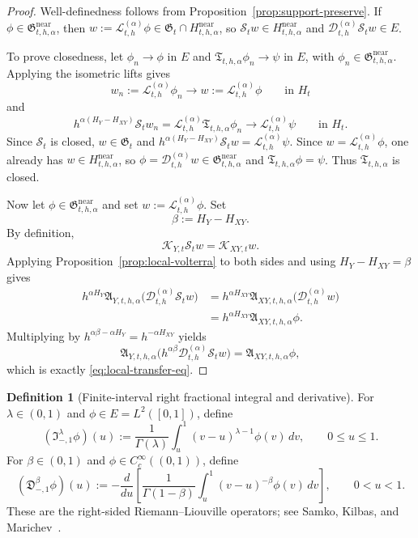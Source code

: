 \documentclass[11pt,a4paper]{amsart}
\theoremstyle{plain}
\theoremstyle{definition}
\newtheorem{definition}[theorem]{Definition}
\theoremstyle{remark}
\begin{document}
\begin{proof}
Well-definedness follows from Proposition~\ref{prop:support-preserve}.  If
$\phi\in\mathfrak G_{t,h,\alpha}^{\mathrm{near}}$, then
$w:=\mathcal L_{t,h}^{(\alpha)}\phi\in \mathfrak G_t\cap H_{t,h,\alpha}^{\mathrm{near}}$, so
$\mathcal S_t w\in H_{t,h,\alpha}^{\mathrm{near}}$ and
$\mathcal D_{t,h}^{(\alpha)}\mathcal S_t w\in E$.

To prove closedness, let $\phi_n\to\phi$ in $E$ and
$\mathfrak T_{t,h,\alpha}\phi_n\to\psi$ in $E$, with
$\phi_n\in\mathfrak G_{t,h,\alpha}^{\mathrm{near}}$. Applying the isometric lifts gives
\[
w_n:=\mathcal L_{t,h}^{(\alpha)}\phi_n\to w:=\mathcal L_{t,h}^{(\alpha)}\phi
\qquad\text{in }H_t
\]
and
\[
h^{\alpha(H_Y-H_{XY})}\mathcal S_t w_n
=
\mathcal L_{t,h}^{(\alpha)}\mathfrak T_{t,h,\alpha}\phi_n
\longrightarrow
\mathcal L_{t,h}^{(\alpha)}\psi
\qquad\text{in }H_t.
\]
Since $\mathcal S_t$ is closed, $w\in\mathfrak G_t$ and
$h^{\alpha(H_Y-H_{XY})}\mathcal S_t w=\mathcal L_{t,h}^{(\alpha)}\psi$. Since
$w=\mathcal L_{t,h}^{(\alpha)}\phi$, one already has $w\in H_{t,h,\alpha}^{\mathrm{near}}$,
so $\phi=\mathcal D_{t,h}^{(\alpha)}w\in\mathfrak G_{t,h,\alpha}^{\mathrm{near}}$ and
$\mathfrak T_{t,h,\alpha}\phi=\psi$. Thus $\mathfrak T_{t,h,\alpha}$ is closed.

Now let $\phi\in\mathfrak G_{t,h,\alpha}^{\mathrm{near}}$ and set
$w:=\mathcal L_{t,h}^{(\alpha)}\phi$. Set
\[
\beta:=H_Y-H_{XY}.
\]
By definition,
\[
\mathcal K_{Y,t}\mathcal S_t w=\mathcal K_{XY,t}w.
\]
Applying Proposition~\ref{prop:local-volterra} to both sides and using
$H_Y-H_{XY}=\beta$ gives
\begin{align*}
h^{\alpha H_Y}
\mathfrak A_{Y,t,h,\alpha}
\bigl(\mathcal D_{t,h}^{(\alpha)}\mathcal S_t w\bigr)
&=
h^{\alpha H_{XY}}
\mathfrak A_{XY,t,h,\alpha}
\bigl(\mathcal D_{t,h}^{(\alpha)}w\bigr) \\
&=
h^{\alpha H_{XY}}
\mathfrak A_{XY,t,h,\alpha}\phi.
\end{align*}
Multiplying by $h^{\alpha\beta-\alpha H_Y}=h^{-\alpha H_{XY}}$ yields
\[
\mathfrak A_{Y,t,h,\alpha}
\bigl(
h^{\alpha\beta}\mathcal D_{t,h}^{(\alpha)}\mathcal S_t w
\bigr)
=
\mathfrak A_{XY,t,h,\alpha}\phi,
\]
which is exactly \eqref{eq:local-transfer-eq}.
\end{proof}

\begin{definition}[Finite-interval right fractional integral and derivative]
\label{def:unit-fractional}
For $\lambda\in(0,1)$ and $\phi\in E=L^2([0,1])$, define
\begin{equation}\label{eq:Iminus1}
(\mathfrak I_{-,1}^\lambda \phi)(u)
:=
\frac{1}{\Gamma(\lambda)}
\int_u^1 (v-u)^{\lambda-1}\phi(v)\,dv,
\qquad 0\le u\le 1.
\end{equation}
For $\beta\in(0,1)$ and $\phi\in C_c^\infty((0,1))$, define
\begin{equation}\label{eq:Dminus1}
(\mathfrak D_{-,1}^\beta \phi)(u)
:=
-\frac{d}{du}
\left[
\frac{1}{\Gamma(1-\beta)}
\int_u^1 (v-u)^{-\beta}\phi(v)\,dv
\right],
\qquad 0<u<1.
\end{equation}
These are the right-sided Riemann--Liouville operators; see
Samko, Kilbas, and Marichev~\cite[Ch.~2]{SKM93}.
\end{definition}
\end{document}
